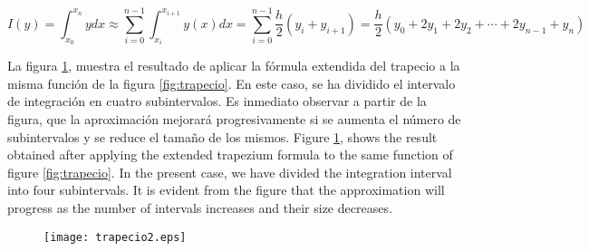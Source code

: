 \begin{equation*}
I(y)=\int_{x_0}^{x_n}ydx \approx \sum_{i=0}^{n-1}\int_{x_i}^{x_{i+1}}y(x)dx=\sum_{i=0}^{n-1}\frac{h}{2}(y_i+y_{i+1})=\frac{h}{2}\left(y_0+2y_1+2y_2+\cdots+2y_{n-1}+y_n \right)
\end{equation*}
\begin{paracol}{2}
La figura \ref{fig:trapecio2}, muestra el resultado de aplicar la fórmula extendida del trapecio a la misma función de la figura \ref{fig:trapecio}. En este caso, se ha dividido el intervalo de integración en cuatro subintervalos. Es inmediato observar a partir de la figura, que la aproximación mejorará progresivamente si se aumenta el número de subintervalos y se reduce el tamaño de los mismos.
\switchcolumn
Figure \ref{fig:trapecio2}, shows the result obtained after applying the extended trapezium formula to the same function of figure \ref{fig:trapecio}. In the present case, we have divided the integration interval into four subintervals. It is evident from the figure that the approximation will progress as the number of intervals increases and their size decreases. 
\end{paracol}
\begin{figure}[h]
\centering
\texttt{[image: trapecio2.eps]}
\label{fig:trapecio2}
\end{figure}
